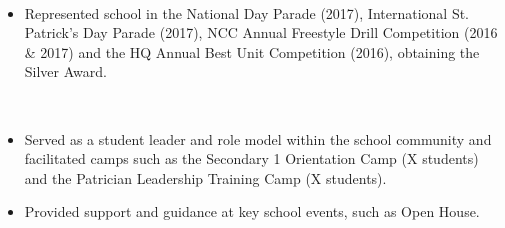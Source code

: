 \documentclass[a4paper,10pt]{article}
\begin{document}
\begin{center}
\begin{minipage}{1\textwidth}
      \vspace{0.25cm}

      \noindent
      \hfill
      \\

      \vspace{0.15cm}

      \begin{itemize}[left=0pt, labelsep=0.5em, itemsep=0pt, topsep=0pt, parsep=0pt, partopsep=0pt]
        \item \small\lato Represented school in the National Day Parade (2017), International St. Patrick's Day Parade (2017), NCC Annual Freestyle Drill Competition (2016 \& 2017) and the HQ Annual Best Unit Competition (2016), obtaining the Silver Award.
      \end{itemize}
      
      \vspace{0.25cm}

      \noindent
      \hfill
      \\

      \vspace{0.15cm}

      \begin{itemize}[left=0pt, labelsep=0.5em, itemsep=0pt, topsep=0pt, parsep=0pt, partopsep=0pt]
        \item \small\lato Served as a student leader and role model within the school community and facilitated camps such as the Secondary 1 Orientation Camp (X students) and the Patrician Leadership Training Camp (X students).
        \item \small\lato Provided support and guidance at key school events, such as Open House.\\
      \end{itemize}
            
      \normalsize\noindent{}\\[-0.25cm]
      \makebox[\linewidth]{\rule{1.02\linewidth}{0.3pt}}
      \normalsize{}

      \normalsize\noindent{}\\[-0.25cm]
      \makebox[\linewidth]{\rule{1.02\linewidth}{0.3pt}}


\end{minipage}
\end{center}
\end{document}
